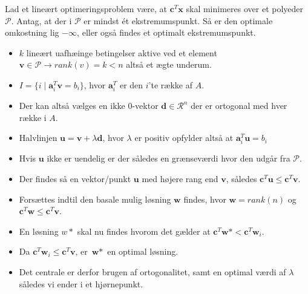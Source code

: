 \begin{frame}
Lad et lineært optimeringsproblem være, at $\textbf{c}^T \textbf{x}$ skal minimeres over et polyeder $\mathcal{P}$. 
Antag, at der i $\mathcal{P}$ er mindst ét ekstremumspunkt. 
Så er den optimale omkostning lig $- \infty$, eller også findes et optimalt ekstremumspunkt.
\end{frame}

\begin{frame}
\begin{itemize}
\item $k$ lineært uafhæinge betingelser aktive ved et element $\textbf{v}\in \mathcal{P} \rightarrow rank(v)=k < n$ altså et ægte underum.
\item $I = \{ i \mid \textbf{a}^T_i \textbf{v} = b_i \}$, hvor $\textbf{a}^T_i$ er den $i$'te række af $A$.
\item  Der kan altså vælges en ikke $0$-vektor $\textbf{d} \in \mathcal{R}^n$ der er ortogonal med hver række i $A$.
\item Halvlinjen $\textbf{u}=\textbf{v}+ \lambda \textbf{d}$, hvor $\lambda$ er positiv opfylder altså at $\textbf{a}^T_i \textbf{u} = b_i$
\end{itemize}
\end{frame}
\begin{frame}
\begin{itemize}
\item Hvis $\textbf{u}$ ikke er uendelig er der således en grænseværdi hvor den udgår fra $\mathcal{P}$.
\item Der findes så en vektor/punkt $\textbf{u}$ med højere rang end $\textbf{v}$, således $\textbf{c}^T \textbf{u} \leq \textbf{c}^T \textbf{v}$.
\item Forsættes indtil den basale mulig løsning $\textbf{w}$ findes, hvor $\textbf{w}=rank(n)$ og $\textbf{c}^T \textbf{w} \leq \textbf{c}^T \textbf{v}$.
\end{itemize}
\end{frame}
\begin{frame}
\begin{itemize}
\item En løsning $w*$ skal nu findes hvorom det gælder at $\textbf{c}^T\textbf{w}*<\textbf{c}^T \textbf{w}_i$.
\item Da $\textbf{c}^T \textbf{w}_i \leq \textbf{c}^T \textbf{v}$, er $\textbf{w}*$ en optimal løsning.
\item Det centrale er derfor brugen af ortogonalitet, samt en optimal værdi af $\lambda$ således vi ender i et hjørnepunkt.
\end{itemize}
\end{frame}
